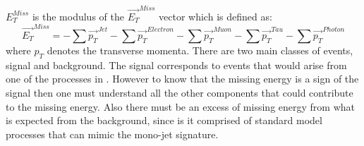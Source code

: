 $E_T^{Miss}$ is the modulus of the $\vec{E_T}^{Miss}$ vector which is defined as:
\begin{equation}\label{eq:etmiss}
\vec{E_T}^{Miss} = - \sum \vec{p_T}^{Jet} - \sum \vec{p_T}^{Electron} - \sum \vec{p_T}^{Muon} - \sum \vec{p_T}^{Tau} - \sum \vec{p_T}^{Photon}
\end{equation}  
where $p_T$ denotes the transverse momenta.
There are two main classes of events, signal and background. 
The signal corresponds to events that would arise from one of the processes in . However to know that the missing energy is a sign of the signal then one must understand all the other components that could contribute to the missing energy. Also there must be an excess of missing energy from what is expected from the background, since is it comprised of standard model processes that can mimic the mono-jet signature.
